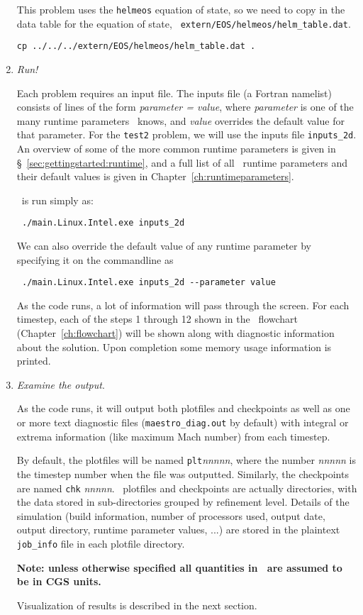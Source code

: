 \begin{enumerate}
This problem uses the {\tt helmeos} equation of state, so 
we need to copy in the data table for the equation of state, {\tt
  extern/EOS/helmeos/helm\_table.dat}.

\begin{verbatim}
cp ../../../extern/EOS/helmeos/helm_table.dat .
\end{verbatim}


\item {\em Run!}

Each problem requires an input file.  The inputs file (a Fortran
namelist) consists of
lines of the form {\em parameter = value}, where {\em parameter} is
one of the many runtime parameters \maestro\ knows, and {\em value}
overrides the default value for that parameter.  For the {\tt test2}
problem, we will use the inputs file {\tt inputs\_2d}.  An overview of
some of the more common runtime parameters is given
in \S~\ref{sec:gettingstarted:runtime}, and a full list of
all \maestro\ runtime parameters and their default values is given in
Chapter~\ref{ch:runtimeparameters}.

\maestro\ is run simply as:
\begin{verbatim}
 ./main.Linux.Intel.exe inputs_2d
\end{verbatim}
We can also override the default value of any runtime parameter by specifying
it on the commandline as
\begin{verbatim}
 ./main.Linux.Intel.exe inputs_2d --parameter value
\end{verbatim}

As the code runs, a lot of information will pass through the screen.
For each timestep, each of the steps 1 through 12 shown in
the \maestro\ flowchart (Chapter~\ref{ch:flowchart}) will be shown
along with diagnostic information about the solution.  Upon completion
some memory usage information is printed.


\item {\em Examine the output}.

As the code runs, it will output both plotfiles and checkpoints as
well as one or more text diagnostic files ({\tt maestro\_diag.out} by
default) with integral or extrema information (like maximum Mach
number) from each timestep.

By default, the plotfiles will be named {\tt plt}{\em nnnnn}, where
the number {\em nnnnn} is the timestep number when the file was
outputted.  Similarly, the checkpoints are named {\tt chk}{\em
nnnnn}.  \boxlib\ plotfiles and checkpoints are actually directories,
with the data stored in sub-directories grouped by refinement level.
Details of the simulation (build information, number of processors
used, output date, output directory, runtime parameter values, ...)
are stored in the plaintext {\tt job\_info} file in each plotfile directory.

{\bf Note: unless otherwise specified all quantities in \maestro\ are
assumed to be in CGS units.}

Visualization of results is described in the next section.


\end{enumerate}


